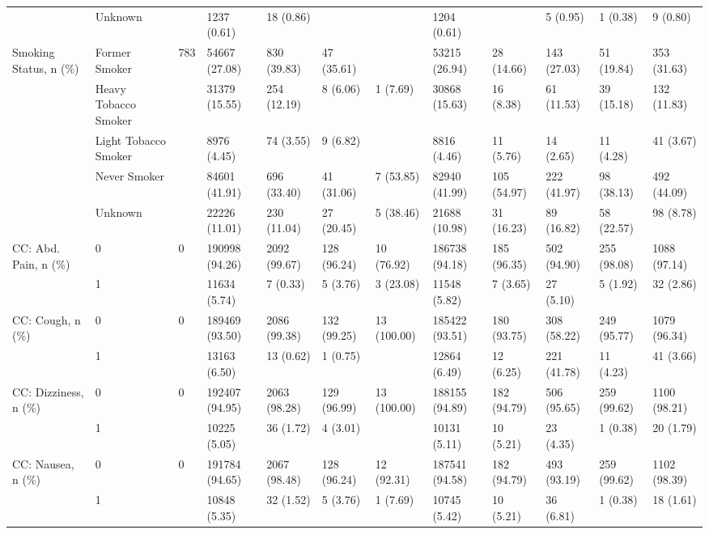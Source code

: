 \begin{tabular}{llllllllllll}
 & Unknown &  & 1237 (0.61) & 18 (0.86) &  &  & 1204 (0.61) &  & 5 (0.95) & 1 (0.38) & 9 (0.80) \\
\cline{1-12}
\multirow[t]{5}{*}{Smoking Status, n (\%)} & Former Smoker & 783 & 54667 (27.08) & 830 (39.83) & 47 (35.61) &  & 53215 (26.94) & 28 (14.66) & 143 (27.03) & 51 (19.84) & 353 (31.63) \\
 & Heavy Tobacco Smoker &  & 31379 (15.55) & 254 (12.19) & 8 (6.06) & 1 (7.69) & 30868 (15.63) & 16 (8.38) & 61 (11.53) & 39 (15.18) & 132 (11.83) \\
 & Light Tobacco Smoker &  & 8976 (4.45) & 74 (3.55) & 9 (6.82) &  & 8816 (4.46) & 11 (5.76) & 14 (2.65) & 11 (4.28) & 41 (3.67) \\
 & Never Smoker &  & 84601 (41.91) & 696 (33.40) & 41 (31.06) & 7 (53.85) & 82940 (41.99) & 105 (54.97) & 222 (41.97) & 98 (38.13) & 492 (44.09) \\
 & Unknown &  & 22226 (11.01) & 230 (11.04) & 27 (20.45) & 5 (38.46) & 21688 (10.98) & 31 (16.23) & 89 (16.82) & 58 (22.57) & 98 (8.78) \\
\cline{1-12}
\multirow[t]{2}{*}{CC: Abd. Pain, n (\%)} & 0 & 0 & 190998 (94.26) & 2092 (99.67) & 128 (96.24) & 10 (76.92) & 186738 (94.18) & 185 (96.35) & 502 (94.90) & 255 (98.08) & 1088 (97.14) \\
 & 1 &  & 11634 (5.74) & 7 (0.33) & 5 (3.76) & 3 (23.08) & 11548 (5.82) & 7 (3.65) & 27 (5.10) & 5 (1.92) & 32 (2.86) \\
\cline{1-12}
\multirow[t]{2}{*}{CC: Cough, n (\%)} & 0 & 0 & 189469 (93.50) & 2086 (99.38) & 132 (99.25) & 13 (100.00) & 185422 (93.51) & 180 (93.75) & 308 (58.22) & 249 (95.77) & 1079 (96.34) \\
 & 1 &  & 13163 (6.50) & 13 (0.62) & 1 (0.75) &  & 12864 (6.49) & 12 (6.25) & 221 (41.78) & 11 (4.23) & 41 (3.66) \\
\cline{1-12}
\multirow[t]{2}{*}{CC: Dizziness, n (\%)} & 0 & 0 & 192407 (94.95) & 2063 (98.28) & 129 (96.99) & 13 (100.00) & 188155 (94.89) & 182 (94.79) & 506 (95.65) & 259 (99.62) & 1100 (98.21) \\
 & 1 &  & 10225 (5.05) & 36 (1.72) & 4 (3.01) &  & 10131 (5.11) & 10 (5.21) & 23 (4.35) & 1 (0.38) & 20 (1.79) \\
\cline{1-12}
\multirow[t]{2}{*}{CC: Nausea, n (\%)} & 0 & 0 & 191784 (94.65) & 2067 (98.48) & 128 (96.24) & 12 (92.31) & 187541 (94.58) & 182 (94.79) & 493 (93.19) & 259 (99.62) & 1102 (98.39) \\
 & 1 &  & 10848 (5.35) & 32 (1.52) & 5 (3.76) & 1 (7.69) & 10745 (5.42) & 10 (5.21) & 36 (6.81) & 1 (0.38) & 18 (1.61) \\

\end{tabular}
